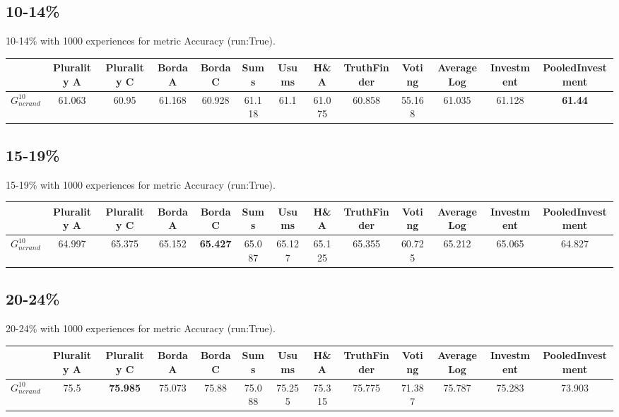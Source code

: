 \documentclass{article}
\newcommand{\graph}[2]{$G_{#1}^{#2}$}
\begin{document}
\newpage

\subsection{10-14\%}

10-14\% with 1000 experiences for metric Accuracy (run:True).

\noindent\begin{tabular}{|l|c|c|c|c|c|c|c|c|c|c|c|c|}
\hline
& Plurality A& Plurality C& Borda A& Borda C& Sums& Usums& H\&A& TruthFinder& Voting& AverageLog& Investment& PooledInvestment\\
\hline
\graph{ncrand}{10} &61.063&60.95&61.168&60.928&61.118&61.1&61.075&60.858&55.168&61.035&61.128&\textbf{61.44}\\
\hline
\end{tabular}
\newpage

\subsection{15-19\%}

15-19\% with 1000 experiences for metric Accuracy (run:True).

\noindent\begin{tabular}{|l|c|c|c|c|c|c|c|c|c|c|c|c|}
\hline
& Plurality A& Plurality C& Borda A& Borda C& Sums& Usums& H\&A& TruthFinder& Voting& AverageLog& Investment& PooledInvestment\\
\hline
\graph{ncrand}{10} &64.997&65.375&65.152&\textbf{65.427}&65.087&65.127&65.125&65.355&60.725&65.212&65.065&64.827\\
\hline
\end{tabular}
\newpage

\subsection{20-24\%}

20-24\% with 1000 experiences for metric Accuracy (run:True).

\noindent\begin{tabular}{|l|c|c|c|c|c|c|c|c|c|c|c|c|}
\hline
& Plurality A& Plurality C& Borda A& Borda C& Sums& Usums& H\&A& TruthFinder& Voting& AverageLog& Investment& PooledInvestment\\
\hline
\graph{ncrand}{10} &75.5&\textbf{75.985}&75.073&75.88&75.088&75.255&75.315&75.775&71.387&75.787&75.283&73.903\\
\hline
\end{tabular}
\newpage
\end{document}
